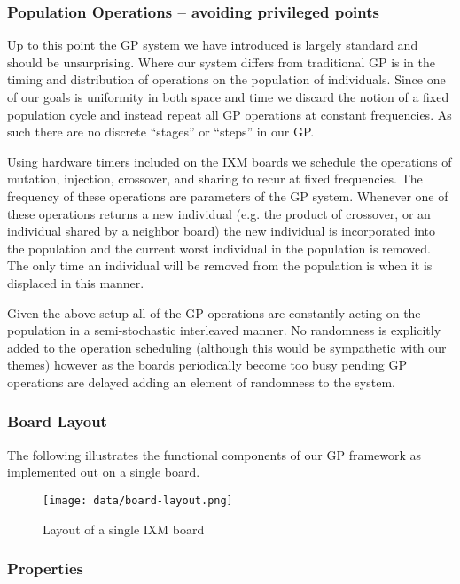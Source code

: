 \documentclass[11pt]{article}
\begin{document}
\subsubsection*{Population Operations -- avoiding privileged points}
\label{sec-1.3.3}

Up to this point the GP system we have introduced is largely standard
and should be unsurprising.  Where our system differs from traditional
GP is in the timing and distribution of operations on the population
of individuals.  Since one of our goals is uniformity in both space
and time we discard the notion of a fixed population cycle and instead
repeat all GP operations at constant frequencies.  As such there are
no discrete ``stages'' or ``steps'' in our GP.

Using hardware timers included on the IXM boards we schedule the
operations of mutation, injection, crossover, and sharing to recur at
fixed frequencies.  The frequency of these operations are parameters
of the GP system.  Whenever one of these operations returns a new
individual (e.g. the product of crossover, or an individual shared by
a neighbor board) the new individual is incorporated into the
population and the current worst individual in the population is
removed.  The only time an individual will be removed from the
population is when it is displaced in this manner.

Given the above setup all of the GP operations are constantly acting
on the population in a semi-stochastic interleaved manner.  No
randomness is explicitly added to the operation scheduling (although
this would be sympathetic with our themes) however as the boards
periodically become too busy pending GP operations are delayed adding
an element of randomness to the system.

\subsubsection*{Board Layout}
\label{sec-1.3.4}

The following illustrates the functional components of our GP
framework as implemented out on a single board.

\begin{figure}[htb]
\centering
\texttt{[image: data/board-layout.png]}
\caption{Layout of a single IXM board}
\end{figure}



\subsubsection*{Properties}
\label{sec-1.3.5}
\end{document}

